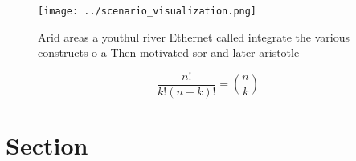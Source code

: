 \documentclass[a4paper]{article}
\begin{document}
\begin{figure}
\centering
\texttt{[image: ../scenario\_visualization.png]}
\caption{Arid areas a youthul river Ethernet called integrate the various constructs o a Then motivated sor and later aristotle 
}
\end{figure}
 
\[ \frac{n!}{k!(n-k)!} = \binom{n}{k} \]

\section{Section}
\end{document}
